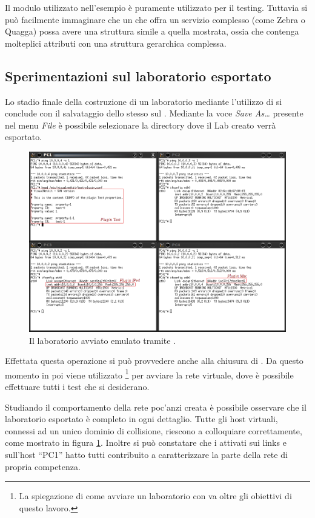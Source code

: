 Il modulo utilizzato nell'esempio è puramente utilizzato per il testing. Tuttavia si può facilmente immaginare che un \plugin{} che offra un servizio complesso (come Zebra o Quagga) possa avere una struttura simile a quella mostrata, ossia che contenga molteplici attributi con una struttura gerarchica complessa.

\subsection{Sperimentazioni sul laboratorio esportato}
Lo stadio finale della costruzione di un laboratorio mediante l'utilizzo di \visualnetkit{} si conclude con il salvataggio dello stesso sul \fs{}. Mediante la voce \emph{Save As\ldots} presente nel menu \emph{File} è possibile selezionare la directory dove il Lab creato verrà esportato.

\begin{figure}[!htb]
	\centering
	\includegraphics[width=13cm]{images/netkit_lab_example.png}
	\caption{Il laboratorio avviato emulato tramite \netkit{}.}
	\label{figura:ex_netkit}
\end{figure}

Effettata questa operazione si può provvedere anche alla chiusura di \visualnetkit{}. Da questo momento in poi viene utilizzato \netkit{}\footnote{La spiegazione di come avviare un laboratorio con \netkit{} va oltre gli obiettivi di questo lavoro.} per avviare la rete virtuale, dove è possibile effettuare tutti i test che si desiderano.

Studiando il comportamento della rete poc'anzi creata è possibile osservare che il laboratorio esportato è completo in ogni dettaglio. Tutte gli host virtuali, connessi ad un unico dominio di collisione, riescono a colloquiare correttamente, come mostrato in figura \ref{figura:ex_netkit}. Inoltre si può constatare che i \plugin{} attivati sui links e sull'host ``PC1'' hatto tutti contribuito a caratterizzare la parte della rete di propria competenza.

